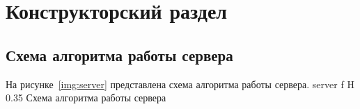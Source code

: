 \chapter{Конструкторский раздел}

\section{Схема алгоритма работы сервера}

На рисунке~\ref{img:server} представлена схема алгоритма работы сервера.
	{server}
	{f}
	{H}
	{0.35\textwidth}
	{Схема алгоритма работы сервера}